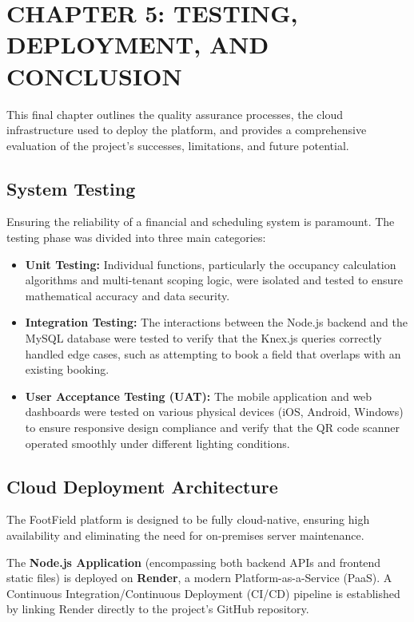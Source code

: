 \section*{CHAPTER 5: TESTING, DEPLOYMENT, AND CONCLUSION}
\setcounter{section}{5}
\setcounter{subsection}{0}
\setcounter{figure}{0}
\setcounter{table}{0}

This final chapter outlines the quality assurance processes, the cloud infrastructure used to deploy the platform, and provides a comprehensive evaluation of the project's successes, limitations, and future potential.

\subsection{System Testing}
Ensuring the reliability of a financial and scheduling system is paramount. The testing phase was divided into three main categories:
\begin{itemize}
    \item \textbf{Unit Testing:} Individual functions, particularly the occupancy calculation algorithms and multi-tenant scoping logic, were isolated and tested to ensure mathematical accuracy and data security.
    \item \textbf{Integration Testing:} The interactions between the Node.js backend and the MySQL database were tested to verify that the Knex.js queries correctly handled edge cases, such as attempting to book a field that overlaps with an existing booking.
    \item \textbf{User Acceptance Testing (UAT):} The mobile application and web dashboards were tested on various physical devices (iOS, Android, Windows) to ensure responsive design compliance and verify that the QR code scanner operated smoothly under different lighting conditions.
\end{itemize}

\subsection{Cloud Deployment Architecture}
The FootField platform is designed to be fully cloud-native, ensuring high availability and eliminating the need for on-premises server maintenance.

The \textbf{Node.js Application} (encompassing both backend APIs and frontend static files) is deployed on \textbf{Render}, a modern Platform-as-a-Service (PaaS). A Continuous Integration/Continuous Deployment (CI/CD) pipeline is established by linking Render directly to the project's GitHub repository.

